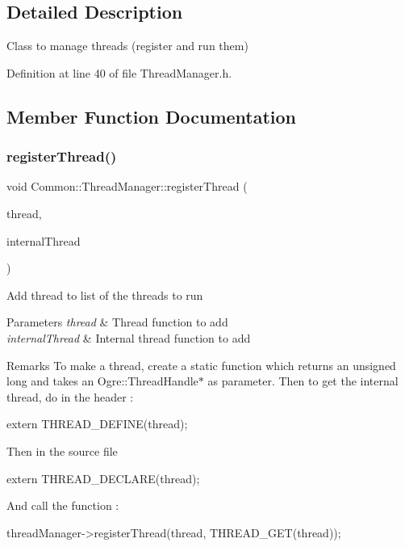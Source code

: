 \subsection{Detailed Description}
Class to manage threads (register and run them) 

Definition at line 40 of file Thread\+Manager.\+h.



\subsection{Member Function Documentation}
\mbox{\label{class_common_1_1_thread_manager_a79a947a3ff5c8a34e51cc41007832aeb}} 
\subsubsection{\texorpdfstring{register\+Thread()}{registerThread()}}
{\footnotesize\ttfamily void Common\+::\+Thread\+Manager\+::register\+Thread (\begin{DoxyParamCaption}\item[{Thread\+Func}]{thread,  }\item[{Ogre\+::\+T\+H\+R\+E\+A\+D\+\_\+\+E\+N\+T\+R\+Y\+\_\+\+P\+O\+I\+NT}]{internal\+Thread }\end{DoxyParamCaption})\hspace{0.3cm}{\ttfamily [virtual]}}

Add thread to list of the threads to run 
\begin{DoxyParams}{Parameters}
{\em thread} & Thread function to add \\
\hline
{\em internal\+Thread} & Internal thread function to add \\
\hline
\end{DoxyParams}
\begin{DoxyRemark}{Remarks}
To make a thread, create a static function which returns an unsigned long and takes an Ogre\+::\+Thread\+Handle$\ast$ as parameter. Then to get the internal thread, do in the header \+: 
\begin{DoxyCode}
\textcolor{keyword}{extern} THREAD\_DEFINE(thread);
\end{DoxyCode}
 Then in the source file 
\begin{DoxyCode}
\textcolor{keyword}{extern} THREAD\_DECLARE(thread);
\end{DoxyCode}
 And call the function \+: 
\begin{DoxyCode}
threadManager->registerThread(thread, THREAD\_GET(thread));
\end{DoxyCode}
 
\end{DoxyRemark}


